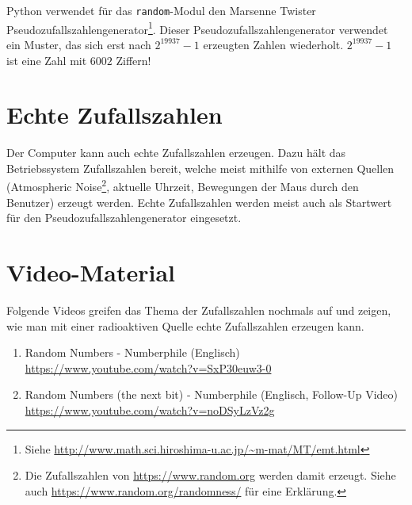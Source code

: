 \begin{example}
Python verwendet für das \lstinline{random}-Modul den Marsenne Twister Pseudozufallszahlengenerator\footnote{Siehe \url{http://www.math.sci.hiroshima-u.ac.jp/~m-mat/MT/emt.html}}. Dieser Pseudozufallszahlengenerator verwendet ein Muster, das sich erst nach $2^{19937}-1$ erzeugten Zahlen wiederholt. $2^{19937}-1$ ist eine Zahl mit $6002$ Ziffern!
\end{example}


\section{Echte Zufallszahlen}

Der Computer kann auch echte Zufallszahlen erzeugen. Dazu hält das Betriebssystem Zufallszahlen bereit, welche meist mithilfe von externen Quellen (Atmospheric Noise\footnote{Die Zufallszahlen von \url{https://www.random.org} werden damit erzeugt. Siehe auch \url{https://www.random.org/randomness/} für eine Erklärung.}, aktuelle Uhrzeit, Bewegungen der Maus durch den Benutzer) erzeugt werden. Echte Zufallszahlen werden meist auch als Startwert für den Pseudozufallszahlengenerator eingesetzt.

\section{Video-Material}

Folgende Videos greifen das Thema der Zufallszahlen nochmals auf und zeigen, wie man mit einer radioaktiven Quelle echte Zufallszahlen erzeugen kann.

\begin{enumerate}
\item Random Numbers - Numberphile (Englisch) \\ \url{https://www.youtube.com/watch?v=SxP30euw3-0}
\item Random Numbers (the next bit) - Numberphile (Englisch, Follow-Up Video) \\ \url{https://www.youtube.com/watch?v=noDSyLzVz2g}
\end{enumerate}

